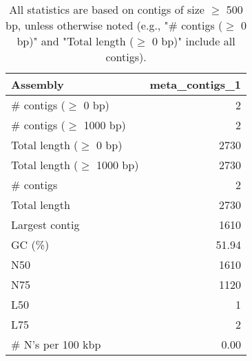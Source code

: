 \documentclass[12pt,a4paper]{article}
\begin{document}
\begin{table}[ht]
\begin{center}
\caption{All statistics are based on contigs of size $\geq$ 500 bp, unless otherwise noted (e.g., "\# contigs ($\geq$ 0 bp)" and "Total length ($\geq$ 0 bp)" include all contigs).}
\begin{tabular}{|l*{1}{|r}|}
\hline
Assembly & meta\_contigs\_1 \\ \hline
\# contigs ($\geq$ 0 bp) & 2 \\ \hline
\# contigs ($\geq$ 1000 bp) & 2 \\ \hline
Total length ($\geq$ 0 bp) & 2730 \\ \hline
Total length ($\geq$ 1000 bp) & 2730 \\ \hline
\# contigs & 2 \\ \hline
Total length & 2730 \\ \hline
Largest contig & 1610 \\ \hline
GC (\%) & 51.94 \\ \hline
N50 & 1610 \\ \hline
N75 & 1120 \\ \hline
L50 & 1 \\ \hline
L75 & 2 \\ \hline
\# N's per 100 kbp & 0.00 \\ \hline
\end{tabular}
\end{center}
\end{table}
\end{document}
